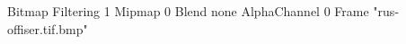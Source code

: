 {Bitmap
	{Filtering 1}
	{Mipmap 0}
	{Blend none}
	{AlphaChannel 0}
	{Frame "rus-offiser.tif.bmp"}
}
